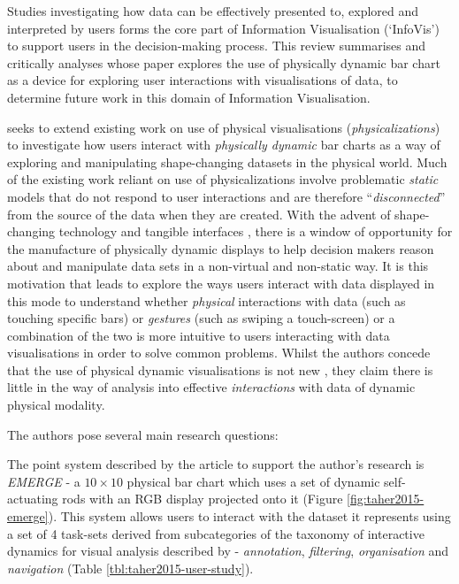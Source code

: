 \documentclass[11pt]{article}
\begin{document}

Studies investigating how data can be effectively presented to, explored and interpreted by users forms the core part of Information Visualisation (`InfoVis') to support users in the decision-making process. This review summarises and critically analyses \citet{taher2015} whose paper explores the use of physically dynamic bar chart as a device for exploring user interactions with visualisations of data, to determine future work in this domain of Information Visualisation.

\citeauthor{taher2015} seeks to extend existing work on use of physical visualisations (\textit{physicalizations}) \citep{jansen2015} to investigate how users interact with \textit{physically dynamic} bar charts as a way of exploring and manipulating shape-changing datasets in the physical world. Much of the existing work reliant on use of physicalizations involve problematic \textit{static} models that do not respond to user interactions \citep{jansen2013} and are therefore ``\textit{disconnected}'' from the source of the data when they are created. With the advent of shape-changing technology and tangible interfaces \citep{rasmussen2012}, there is a window of opportunity for the manufacture of physically dynamic displays to help decision makers reason about and manipulate data sets in a non-virtual and non-static way. It is this motivation that leads \citeauthor{taher2015} to explore the ways users interact with data displayed in this mode to understand whether \textit{physical} interactions with data (such as touching specific bars) or \textit{gestures} (such as swiping a touch-screen) or a combination of the two is more intuitive to users interacting with data visualisations in order to solve common problems. Whilst the authors concede that the use of physical dynamic visualisations is not new \citep{leithinger2010,follmer2013}, they claim there is little in the way of analysis into effective \textit{interactions} with data of dynamic physical modality.

The authors pose several main research questions: 

The point system described by the article to support the author's research is \textit{EMERGE} - a $10\times10$ physical bar chart which uses a set of dynamic self-actuating rods with an RGB display projected onto it (Figure \ref{fig:taher2015-emerge}). This system allows users to interact with the dataset it represents using a set of 4 task-sets derived from subcategories of the taxonomy of interactive dynamics for visual analysis described by \citet{heer2012} - \textit{annotation}, \textit{filtering}, \textit{organisation} and \textit{navigation} (Table \ref{tbl:taher2015-user-study}).
\end{document}
